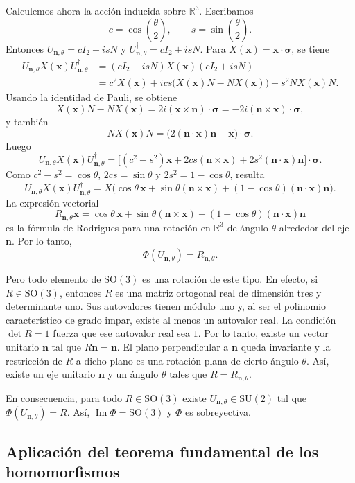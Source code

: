 \documentclass[11pt,a4paper]{article}
\newcommand{\R}{\mathbb{R}}
\newcommand{\SU}{\mathrm{SU}}
\newcommand{\SO}{\mathrm{SO}}
\newcommand{\im}{\operatorname{Im}}
\newcommand{\vect}[1]{\boldsymbol{#1}}
\begin{document}
Calculemos ahora la acción inducida sobre $\R^3$. Escribamos
\[
c=\cos\left(\frac{\theta}{2}\right),\qquad s=\sin\left(\frac{\theta}{2}\right).
\]
Entonces $U_{\vect n,\theta}=cI_2-isN$ y $U_{\vect n,\theta}^\dagger=cI_2+isN$. Para $X(\vect x)=\vect x\cdot\vect\sigma$, se tiene
\begin{align*}
U_{\vect n,\theta}X(\vect x)U_{\vect n,\theta}^\dagger
&=(cI_2-isN)X(\vect x)(cI_2+isN)\\
&=c^2X(\vect x)+ics\bigl(X(\vect x)N-NX(\vect x)\bigr)+s^2NX(\vect x)N.
\end{align*}
Usando la identidad de Pauli, se obtiene
\[
X(\vect x)N-NX(\vect x)=2i(\vect x\times\vect n)\cdot\vect\sigma=-2i(\vect n\times\vect x)\cdot\vect\sigma,
\]
y también
\[
NX(\vect x)N=\bigl(2(\vect n\cdot\vect x)\vect n-\vect x\bigr)\cdot\vect\sigma.
\]
Luego
\[
U_{\vect n,\theta}X(\vect x)U_{\vect n,\theta}^\dagger
=\bigl[(c^2-s^2)\vect x+2cs(\vect n\times\vect x)+2s^2(\vect n\cdot\vect x)\vect n\bigr]\cdot\vect\sigma.
\]
Como $c^2-s^2=\cos\theta$, $2cs=\sin\theta$ y $2s^2=1-\cos\theta$, resulta
\[
U_{\vect n,\theta}X(\vect x)U_{\vect n,\theta}^\dagger
=X\bigl(\cos\theta\,\vect x+\sin\theta(\vect n\times\vect x)+(1-\cos\theta)(\vect n\cdot\vect x)\vect n\bigr).
\]
La expresión vectorial
\[
R_{\vect n,\theta}\vect x=\cos\theta\,\vect x+\sin\theta(\vect n\times\vect x)+(1-\cos\theta)(\vect n\cdot\vect x)\vect n
\]
es la fórmula de Rodrigues para una rotación en $\R^3$ de ángulo $\theta$ alrededor del eje $\vect n$. Por lo tanto,
\[
\Phi(U_{\vect n,\theta})=R_{\vect n,\theta}.
\]

Pero todo elemento de $\SO(3)$ es una rotación de este tipo. En efecto, si $R\in\SO(3)$, entonces $R$ es una matriz ortogonal real de dimensión tres y determinante uno. Sus autovalores tienen módulo uno y, al ser el polinomio característico de grado impar, existe al menos un autovalor real. La condición $\det R=1$ fuerza que ese autovalor real sea $1$. Por lo tanto, existe un vector unitario $\vect n$ tal que $R\vect n=\vect n$. El plano perpendicular a $\vect n$ queda invariante y la restricción de $R$ a dicho plano es una rotación plana de cierto ángulo $\theta$. Así, existe un eje unitario $\vect n$ y un ángulo $\theta$ tales que $R=R_{\vect n,\theta}$.

En consecuencia, para todo $R\in\SO(3)$ existe $U_{\vect n,\theta}\in\SU(2)$ tal que $\Phi(U_{\vect n,\theta})=R$. Así, $\im\Phi=\SO(3)$ y $\Phi$ es sobreyectiva.

\subsection*{Aplicación del teorema fundamental de los homomorfismos}
\end{document}
